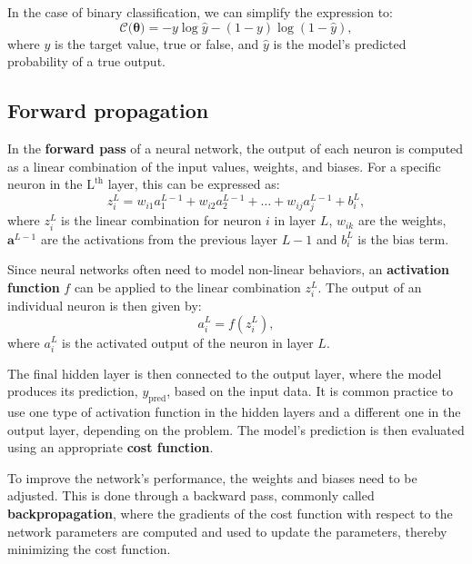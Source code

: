 \documentclass{article}
\begin{document}
\begin{multicols}{2}
In the case of binary classification, we can simplify the expression to:
\begin{equation*}
     \mathcal{C(\bm{\theta}})= -y \log \hat{y} - (1 - y) \log (1 - \hat{y}),
\end{equation*}
where $y$ is the target value, true or false, and $\hat{y}$ is the model's predicted probability of a true output. \cite{hastie_elements_2009}

\subsection*{Forward propagation}
In the \textbf{forward pass} of a neural network, the output of each neuron is computed as a linear combination of the input values, weights, and biases. For a specific neuron in the $\text{L}^{\text{th}}$ layer, this can be expressed as: \begin{equation*} \label{eq
in the neuron} z_i^L = w_{i1} a_1^{L-1} + w_{i2} a_2^{L-1} + \ldots + w_{ij} a_j^{L-1} + b_i^{L}, \end{equation*} where $z_i^L$ is the linear combination for neuron $i$ in layer $L$, $w_{ik}$ are the weights, $\bm{a}^{L-1}$ are the activations from the previous layer $L-1$ and $b_i^L$ is the bias term.

Since neural networks often need to model non-linear behaviors, an \textbf{activation function} $f$ can be applied to the linear combination $z_i^L$. %
The output of an individual neuron is then given by:
\begin{equation*} \label{eq
in a neuron} a_i^L = f(z_i^L), \end{equation*} where $a_i^L$ is the activated output of the neuron in layer $L$. \cite{noauthor_what_2021}

The final hidden layer is then connected to the output layer, where the model produces its prediction, $y_{\text{pred}}$, based on the input data. It is common practice to use one type of activation function in the hidden layers and a different one in the output layer, depending on the problem. The model's prediction is then evaluated using an appropriate \textbf{cost function}.

To improve the network's performance, the weights and biases need to be adjusted. This is done through a backward pass, commonly called \textbf{backpropagation}, where the gradients of the cost function with respect to the network parameters are computed and used to update the parameters, thereby minimizing the cost function. \cite{perrotta_programming_2020}


\end{multicols}
\end{document}
